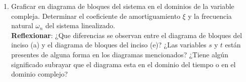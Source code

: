 \documentclass[12pt,a4paper]{report}
\begin{document}
\begin{enumerate}[label=\alph*)]
  \item Graficar en diagrama de bloques del sistema en el dominios de la variable compleja.  Determinar el coeficiente de amortiguamiento $\xi$ y la frecuencia natural $\omega_n$ del sistema linealizado.\\
  \textbf{Reflexionar}: ¿Que diferencias se observan entre el diagrama de bloques del inciso (a) y el diagrama de bloques del inciso (e)? ¿Las variables $s$ y $t$ están presentes de alguna forma en los diagramas mencionados? ¿Tiene algún significado subrayar que el diagrama esta en el dominio del tiempo o en el dominio complejo?

  \end{enumerate}
\end{document}
